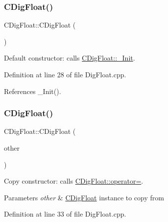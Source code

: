 \subsubsection{\texorpdfstring{C\+Dig\+Float()}{CDigFloat()}\hspace{0.1cm}{\footnotesize\ttfamily [1/3]}}
{\footnotesize\ttfamily C\+Dig\+Float\+::\+C\+Dig\+Float (\begin{DoxyParamCaption}{ }\end{DoxyParamCaption})}



Default constructor\+: calls \hyperlink{classCDigFloat_a89a0dda21c74c115ac41b432031666a6}{C\+Dig\+Float\+::\+\_\+\+Init}. 



Definition at line 28 of file Dig\+Float.\+cpp.



References \+\_\+\+Init().

\mbox{\label{classCDigFloat_a980c2c8c16275a8f838f2f7dc9b3670b}} 
\subsubsection{\texorpdfstring{C\+Dig\+Float()}{CDigFloat()}\hspace{0.1cm}{\footnotesize\ttfamily [2/3]}}
{\footnotesize\ttfamily C\+Dig\+Float\+::\+C\+Dig\+Float (\begin{DoxyParamCaption}\item[{const \hyperlink{classCDigFloat}{C\+Dig\+Float} \&}]{other }\end{DoxyParamCaption})}



Copy constructor\+: calls \hyperlink{classCDigFloat_a74f36566c2c79d7258b7b2dee35d46b2}{C\+Dig\+Float\+::operator=}. 


\begin{DoxyParams}{Parameters}
{\em other} & \hyperlink{classCDigFloat}{C\+Dig\+Float} instance to copy from \\
\hline
\end{DoxyParams}


Definition at line 33 of file Dig\+Float.\+cpp.

\mbox{\label{classCDigFloat_a0ae24452dfb7838ec97a3998cd2b8f36}} 
